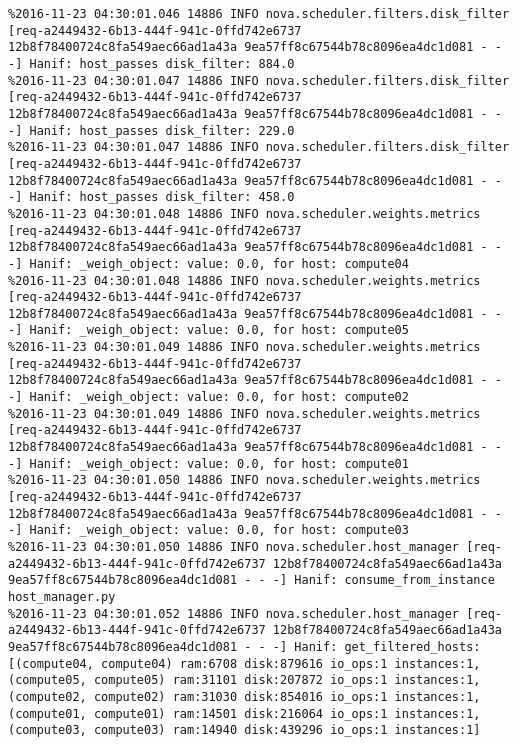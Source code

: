 \begin{lstlisting}[frame=single, caption={The filter scheduler log trace for 10 virtual instances}, label={lst:filterschedulercodetracelog10vi}, escapechar=|]
%2016-11-23 04:30:01.046 14886 INFO nova.scheduler.filters.disk_filter [req-a2449432-6b13-444f-941c-0ffd742e6737 12b8f78400724c8fa549aec66ad1a43a 9ea57ff8c67544b78c8096ea4dc1d081 - - -] Hanif: host_passes disk_filter: 219.0
%2016-11-23 04:30:01.046 14886 INFO nova.scheduler.filters.disk_filter [req-a2449432-6b13-444f-941c-0ffd742e6737 12b8f78400724c8fa549aec66ad1a43a 9ea57ff8c67544b78c8096ea4dc1d081 - - -] Hanif: host_passes disk_filter: 884.0
%2016-11-23 04:30:01.047 14886 INFO nova.scheduler.filters.disk_filter [req-a2449432-6b13-444f-941c-0ffd742e6737 12b8f78400724c8fa549aec66ad1a43a 9ea57ff8c67544b78c8096ea4dc1d081 - - -] Hanif: host_passes disk_filter: 229.0
%2016-11-23 04:30:01.047 14886 INFO nova.scheduler.filters.disk_filter [req-a2449432-6b13-444f-941c-0ffd742e6737 12b8f78400724c8fa549aec66ad1a43a 9ea57ff8c67544b78c8096ea4dc1d081 - - -] Hanif: host_passes disk_filter: 458.0
%2016-11-23 04:30:01.048 14886 INFO nova.scheduler.weights.metrics [req-a2449432-6b13-444f-941c-0ffd742e6737 12b8f78400724c8fa549aec66ad1a43a 9ea57ff8c67544b78c8096ea4dc1d081 - - -] Hanif: _weigh_object: value: 0.0, for host: compute04
%2016-11-23 04:30:01.048 14886 INFO nova.scheduler.weights.metrics [req-a2449432-6b13-444f-941c-0ffd742e6737 12b8f78400724c8fa549aec66ad1a43a 9ea57ff8c67544b78c8096ea4dc1d081 - - -] Hanif: _weigh_object: value: 0.0, for host: compute05
%2016-11-23 04:30:01.049 14886 INFO nova.scheduler.weights.metrics [req-a2449432-6b13-444f-941c-0ffd742e6737 12b8f78400724c8fa549aec66ad1a43a 9ea57ff8c67544b78c8096ea4dc1d081 - - -] Hanif: _weigh_object: value: 0.0, for host: compute02
%2016-11-23 04:30:01.049 14886 INFO nova.scheduler.weights.metrics [req-a2449432-6b13-444f-941c-0ffd742e6737 12b8f78400724c8fa549aec66ad1a43a 9ea57ff8c67544b78c8096ea4dc1d081 - - -] Hanif: _weigh_object: value: 0.0, for host: compute01
%2016-11-23 04:30:01.050 14886 INFO nova.scheduler.weights.metrics [req-a2449432-6b13-444f-941c-0ffd742e6737 12b8f78400724c8fa549aec66ad1a43a 9ea57ff8c67544b78c8096ea4dc1d081 - - -] Hanif: _weigh_object: value: 0.0, for host: compute03
%2016-11-23 04:30:01.050 14886 INFO nova.scheduler.host_manager [req-a2449432-6b13-444f-941c-0ffd742e6737 12b8f78400724c8fa549aec66ad1a43a 9ea57ff8c67544b78c8096ea4dc1d081 - - -] Hanif: consume_from_instance host_manager.py
%2016-11-23 04:30:01.052 14886 INFO nova.scheduler.host_manager [req-a2449432-6b13-444f-941c-0ffd742e6737 12b8f78400724c8fa549aec66ad1a43a 9ea57ff8c67544b78c8096ea4dc1d081 - - -] Hanif: get_filtered_hosts: [(compute04, compute04) ram:6708 disk:879616 io_ops:1 instances:1, (compute05, compute05) ram:31101 disk:207872 io_ops:1 instances:1, (compute02, compute02) ram:31030 disk:854016 io_ops:1 instances:1, (compute01, compute01) ram:14501 disk:216064 io_ops:1 instances:1, (compute03, compute03) ram:14940 disk:439296 io_ops:1 instances:1]

\end{lstlisting}
